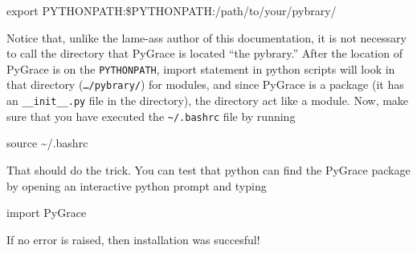 \begin{flushleft}
\begin{command}
export PYTHONPATH:\$PYTHONPATH:/path/to/your/pybrary/
\end{command}

Notice that, unlike the lame-ass author of this documentation, it is
not necessary to call the directory that PyGrace is located ``the
pybrary.''  After the location of PyGrace is on the {\tt PYTHONPATH},
import statement in python scripts will look in that directory
({\tt \dots/pybrary/}) for modules, and since PyGrace is a package (it
has an {\tt \_\_init\_\_.py} file in the directory), the directory act
like a module.  Now, make sure that you have executed the
{\tt \textasciitilde/.bashrc} file by running

\begin{command}
source \textasciitilde/.bashrc
\end{command}

That should do the trick.  You can test that python can find the
PyGrace package by opening an interactive python prompt and typing

\begin{command}
import PyGrace
\end{command}

If no error is raised, then installation was succesful!

\end{flushleft}


